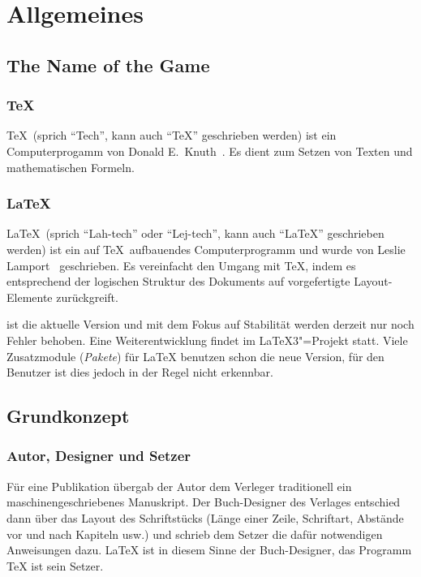 \section{Allgemeines}
\label{sec:allgemeines}
 
\subsection{The Name of the Game}
 
\subsubsection{\TeX}

\TeX\ (sprich \enquote{Tech}, kann auch \enquote{TeX} geschrieben werden) ist
ein Computerprogamm von Donald E.~Knuth~\cite{texbook,schwarz}.
Es dient zum Setzen von Texten und mathematischen Formeln.
 
\subsubsection{\LaTeX}
 
\LaTeX\ (sprich \enquote{Lah-tech} oder \enquote{Lej-tech}, kann auch
\enquote{LaTeX} geschrieben werden) ist ein auf \TeX\ auf\/bauendes 
Computerprogramm und wurde von Leslie Lamport~\cite{manual,wonne} 
geschrieben.  Es vereinfacht den Umgang mit \TeX, indem es 
entsprechend der logischen Struktur des Dokuments auf vorgefertigte
Layout-Elemente zurückgreift.


\LaTeXe{} ist die aktuelle Version und mit dem Fokus auf Stabilität werden derzeit nur noch Fehler behoben. Eine Weiterentwicklung findet im \LaTeX{}3"=Projekt statt. Viele Zusatzmodule (\emph{Pakete}) für \LaTeX{} benutzen schon die neue Version, für den Benutzer ist dies jedoch in der Regel nicht erkennbar.


\subsection{Grundkonzept}
 
\subsubsection{Autor, Designer und Setzer}
 
Für eine Publikation übergab der Autor dem Verleger
traditionell  ein maschinengeschriebenes Manuskript.  Der
Buch-Designer des Verlages entschied dann über das Layout des
Schriftstücks (Länge einer Zeile, Schriftart, Abstände vor
und nach Kapiteln usw.\@) und schrieb dem Setzer die
dafür notwendigen Anweisungen dazu.
\LaTeX{} ist in diesem Sinne der Buch-Designer, 
das Programm \TeX{} ist sein Setzer.
 
